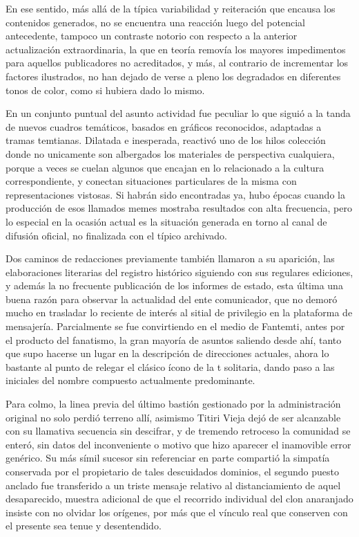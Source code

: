 \documentclass[
]{book}
\begin{document}
En ese sentido, más allá de la típica variabilidad y reiteración que encausa los contenidos generados, no se encuentra una reacción luego del potencial antecedente, tampoco un contraste notorio con respecto a la anterior actualización extraordinaria, la que en teoría removía los mayores impedimentos para aquellos publicadores no acreditados, y más, al contrario de incrementar los factores ilustrados, no han dejado de verse a pleno los degradados en diferentes tonos de color, como si hubiera dado lo mismo.

En un conjunto puntual del asunto actividad fue peculiar lo que siguió a la tanda de nuevos cuadros temáticos, basados en gráficos reconocidos, adaptadas a tramas temtianas. Dilatada e inesperada, reactivó uno de los hilos colección donde no unicamente son albergados los materiales de perspectiva cualquiera, porque a veces se cuelan algunos que encajan en lo relacionado a la cultura correspondiente, y conectan situaciones particulares de la misma con representaciones vistosas. Si habrán sido encontradas ya, hubo épocas cuando la producción de esos llamados memes mostraba resultados con alta frecuencia, pero lo especial en la ocasión actual es la situación generada en torno al canal de difusión oficial, no finalizada con el típico archivado.

Dos caminos de redacciones previamente también llamaron a su aparición, las elaboraciones literarias del registro histórico siguiendo con sus regulares ediciones, y además la no frecuente publicación de los informes de estado, esta última una buena razón para observar la actualidad del ente comunicador, que no demoró mucho en trasladar lo reciente de interés al sitial de privilegio en la plataforma de mensajería. Parcialmente se fue convirtiendo en el medio de Fantemti, antes por el producto del fanatismo, la gran mayoría de asuntos saliendo desde ahí, tanto que supo hacerse un lugar en la descripción de direcciones actuales, ahora lo bastante al punto de relegar el clásico ícono de la t solitaria, dando paso a las iniciales del nombre compuesto actualmente predominante.

Para colmo, la linea previa del último bastión gestionado por la administración original no solo perdió terreno allí, asimismo Titiri Vieja dejó de ser alcanzable con su llamativa secuencia sin descifrar, y de tremendo retroceso la comunidad se enteró, sin datos del inconveniente o motivo que hizo aparecer el inamovible error genérico. Su más símil sucesor sin referenciar en parte compartió la simpatía conservada por el propietario de tales descuidados dominios, el segundo puesto anclado fue transferido a un triste mensaje relativo al distanciamiento de aquel desaparecido, muestra adicional de que el recorrido individual del clon anaranjado insiste con no olvidar los orígenes, por más que el vínculo real que conserven con el presente sea tenue y desentendido.
\end{document}
